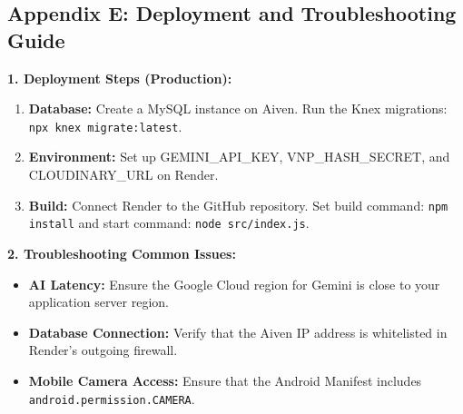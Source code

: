 \subsection*{Appendix E: Deployment and Troubleshooting Guide}

\textbf{1. Deployment Steps (Production):}
\begin{enumerate}
    \item \textbf{Database:} Create a MySQL instance on Aiven. Run the Knex migrations: \texttt{npx knex migrate:latest}.
    \item \textbf{Environment:} Set up GEMINI\_API\_KEY, VNP\_HASH\_SECRET, and CLOUDINARY\_URL on Render.
    \item \textbf{Build:} Connect Render to the GitHub repository. Set build command: \texttt{npm install} and start command: \texttt{node src/index.js}.
\end{enumerate}

\textbf{2. Troubleshooting Common Issues:}
\begin{itemize}
    \item \textbf{AI Latency:} Ensure the Google Cloud region for Gemini is close to your application server region.
    \item \textbf{Database Connection:} Verify that the Aiven IP address is whitelisted in Render's outgoing firewall.
    \item \textbf{Mobile Camera Access:} Ensure that the Android Manifest includes \texttt{android.permission.CAMERA}.
\end{itemize}
